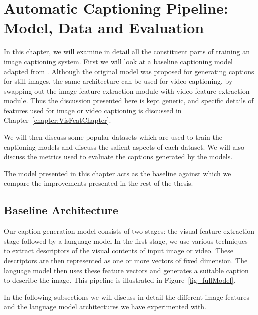\chapter{Automatic Captioning Pipeline: Model, Data and Evaluation}
\label{chapter:baseline}
In this chapter, we will examine in detail all the constituent parts
of training an image captioning system.
First we will look at a baseline captioning model adapted from
\cite{Vinyals_2015_CVPR}. 
Although the original model was proposed for generating captions for still
images, the same architecture can be used for video captioning, by
swapping out the image feature extraction module with video feature extraction
module.
Thus the discussion presented here is kept generic, and specific details of
features used for image or video captioning is discussed in
Chapter~\ref{chapter:VisFeatChapter}.

We will then discuss some popular datasets which are used to train the
captioning models and discuss the salient aspects of each dataset.
We will also discuss the metrics used to evaluate the captions generated by the
models. 

The model presented in this chapter acts as the baseline against which we
compare the improvements presented in the rest of the thesis.

\section{Baseline Architecture} 

Our caption generation model consists of two stages: the visual
feature extraction stage followed by a language model
In the first stage, we use various techniques to extract descriptors of
the visual contents of input image or video.
These descriptors are then represented as one or more vectors of fixed
dimension.
The language model then uses these feature vectors and generates a
suitable caption to describe the image.
This pipeline is illustrated in Figure~\ref{fig_fullModel}. 

In the following subsections we will discuss in detail the different
image features and the language model architectures we have
experimented with.

